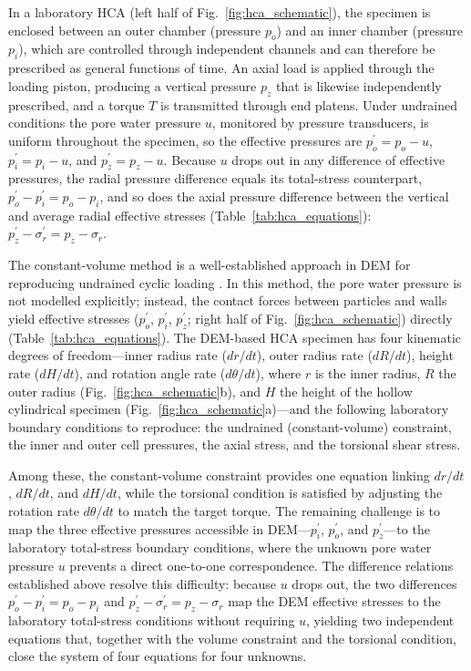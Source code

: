 In a laboratory HCA (left half of Fig.~\ref{fig:hca_schematic}), the specimen is enclosed between an outer chamber (pressure $p_o$) and an inner chamber (pressure $p_i$), which are controlled through independent channels and can therefore be prescribed as general functions of time. An axial load is applied through the loading piston, producing a vertical pressure $p_z$ that is likewise independently prescribed, and a torque $T$ is transmitted through end platens. Under undrained conditions the pore water pressure $u$, monitored by pressure transducers, is uniform throughout the specimen, so the effective pressures are $p_o^{\prime}=p_o-u$, $p_i^{\prime}=p_i-u$, and $p_z^{\prime}=p_z-u$. Because $u$ drops out in any difference of effective pressures, the radial pressure difference equals its total-stress counterpart, $p_o^{\prime}-p_i^{\prime}=p_o-p_i$, and so does the axial pressure difference between the vertical and average radial effective stresses (Table~\ref{tab:hca_equations}): $p_z^{\prime}-\sigma_r^{\prime}=p_z-\sigma_r$.

The constant-volume method is a well-established approach in DEM for reproducing undrained cyclic loading \citep{YimsiriSoga2010}. In this method, the pore water pressure is not modelled explicitly; instead, the contact forces between particles and walls yield effective stresses ($p_o^{\prime}$, $p_i^{\prime}$, $p_z^{\prime}$; right half of Fig.~\ref{fig:hca_schematic}) directly (Table~\ref{tab:hca_equations}). The DEM-based HCA specimen has four kinematic degrees of freedom---inner radius rate ($dr/dt$), outer radius rate ($dR/dt$), height rate ($dH/dt$), and rotation angle rate ($d\theta/dt$), where $r$ is the inner radius, $R$ the outer radius (Fig.~\ref{fig:hca_schematic}b), and $H$ the height of the hollow cylindrical specimen (Fig.~\ref{fig:hca_schematic}a)---and the following laboratory boundary conditions to reproduce: the undrained (constant-volume) constraint, the inner and outer cell pressures, the axial stress, and the torsional shear stress.

Among these, the constant-volume constraint provides one equation linking $dr/dt$, $dR/dt$, and $dH/dt$, while the torsional condition is satisfied by adjusting the rotation rate $d\theta/dt$ to match the target torque. The remaining challenge is to map the three effective pressures accessible in DEM---$p_i^{\prime}$, $p_o^{\prime}$, and $p_z^{\prime}$---to the laboratory total-stress boundary conditions, where the unknown pore water pressure $u$ prevents a direct one-to-one correspondence. The difference relations established above resolve this difficulty: because $u$ drops out, the two differences $p_o^{\prime}-p_i^{\prime}=p_o-p_i$ and $p_z^{\prime}-\sigma_r^{\prime}=p_z-\sigma_r$ map the DEM effective stresses to the laboratory total-stress conditions without requiring $u$, yielding two independent equations that, together with the volume constraint and the torsional condition, close the system of four equations for four unknowns.

